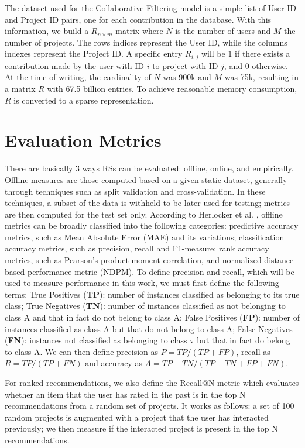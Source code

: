 \documentclass[cic,tc,english]{iiufrgs}
\begin{document}
The dataset used for the Collaborative Filtering model is a simple list of User ID and Project ID pairs, one for each contribution in the database. With this information, we build a \(R_{n\times m}\) matrix where $N$ is the number of users and $M$ the number of projects. The rows indices represent the User ID, while the columns indexes represent the Project ID. A specific entry $R_{i,j}$ will be $1$ if there exists a contribution made by the user with ID $i$ to project with ID $j$, and $0$ otherwise. At the time of writing, the cardinality of $N$ was 900k and $M$ was 75k, resulting in a matrix $R$ with 67.5 billion entries. To achieve reasonable memory consumption, $R$ is converted to a sparse representation.

\section{Evaluation Metrics} \label{metrics}
There are basically 3 ways RSs can be evaluated: offline, online, and empirically. Offline measures are those computed based on a given static dataset, generally through techniques such as split validation and cross-validation. In these techniques, a subset of the data is withheld to be later used for testing; metrics are then computed for the test set only. According to Herlocker et al. \cite{Herlocker2004}, offline metrics can be broadly classified into the following categories: predictive accuracy metrics, such as Mean Absolute Error (MAE) and its variations; classification accuracy metrics, such as precision, recall and F1-measure; rank accuracy metrics, such as Pearson’s product-moment correlation, and normalized distance-based performance metric (NDPM). To define precision and recall, which will be used to measure performance in this work, we must first define the following terms: True Positives (\textbf{TP}): number of instances classified as belonging to its true class; True Negatives (\textbf{TN}): number of instances classified as not belonging to class A and that in fact do not belong to class A; False Positives (\textbf{FP}): number of instances classified as class A but that do not belong to class A; False Negatives (\textbf{FN}): instances not classified as belonging to class v but that in fact do belong to class A. We can then define precision as $P = T P/(T P + F P)$, recall as $R = TP/(TP+FN)$ and accuracy as $A = TP + TN/(TP+TN+FP+FN)$.

For ranked recommendations, we also define the Recall@N metric which evaluates whether an item that the user has rated in the past is in the top N recommendations from a random set of projects. It works as follows: a set of 100 random projects is augmented with a project that the user has interacted previously; we then measure if the interacted project is present in the top N recommendations.
\end{document}
